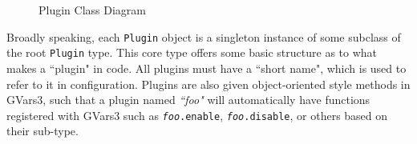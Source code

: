 \documentclass[a4paper,10pt]{report}
\begin{document}
\begin{figure}[h]
\begin{center}
        \normalsize
  \end{center}
  \caption{Plugin Class Diagram}
  \label{pluginclasses}
\end{figure}

Broadly speaking, each \texttt{Plugin} object is a singleton instance of some subclass of the root \texttt{Plugin} type. This core type offers some basic structure as to what makes a ``plugin" in code. All plugins must have a ``short name", which is used to refer to it in configuration. Plugins are also given object-oriented style methods in GVars3, such that a plugin named \textit{``foo"} will automatically have functions registered with GVars3 such as  \texttt{\textit{foo}.enable},  \texttt{\textit{foo}.disable}, or others based on their sub-type. 
\end{document}
